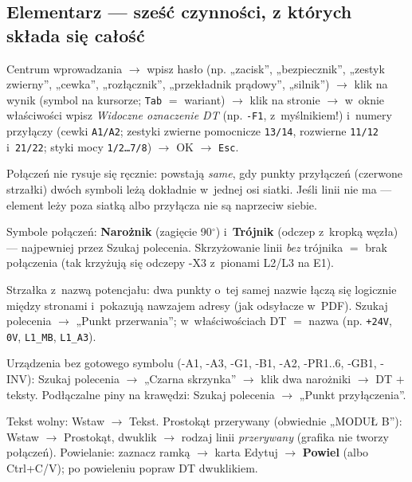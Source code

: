 \documentclass[11pt,a4paper]{article}
\begin{document}
\subsection{Elementarz --- sześć czynności, z których składa się całość}
\begin{description}[style=nextline]
\item[E.1 Wstawienie symbolu.] Centrum wprowadzania $\to$ wpisz hasło (np. „zacisk'', „bezpiecznik'',
„zestyk zwierny'', „cewka'', „rozłącznik'', „przekładnik prądowy'', „silnik'') $\to$ klik na wynik
(symbol na kursorze; \texttt{Tab} $=$ wariant) $\to$ klik na stronie $\to$ w~oknie właściwości wpisz
\emph{Widoczne oznaczenie DT} (np. \texttt{-F1}, z~myślnikiem!) i~numery przyłączy (cewki
\texttt{A1/A2}; zestyki zwierne pomocnicze \texttt{13/14}, rozwierne \texttt{11/12} i~\texttt{21/22};
styki mocy \texttt{1/2\ldots7/8}) $\to$ OK $\to$ \texttt{Esc}.
\item[E.2 Połączenia (autoconnecting).] Połączeń nie rysuje się ręcznie: powstają \emph{same}, gdy
punkty przyłączeń (czerwone strzałki) dwóch symboli leżą dokładnie w~jednej osi siatki. Jeśli linii
nie ma --- element leży poza siatką albo przyłącza nie są naprzeciw siebie.
\item[E.3 Zagięcia i rozgałęzienia.] Symbole połączeń: \textbf{Narożnik} (zagięcie 90$^{\circ}$)
i~\textbf{Trójnik} (odczep z~kropką węzła) --- najpewniej przez Szukaj polecenia. Skrzyżowanie linii
\emph{bez} trójnika $=$ brak połączenia (tak krzyżują się odczepy -X3 z~pionami L2/L3 na E1).
\item[E.4 Punkt przerwania.] Strzałka z~nazwą potencjału: dwa punkty o~tej samej nazwie łączą się
logicznie między stronami i~pokazują nawzajem adresy (jak odsyłacze w~PDF). Szukaj polecenia $\to$
„Punkt przerwania''; w~właściwościach DT $=$ nazwa (np. \texttt{+24V}, \texttt{0V}, \texttt{L1\_MB},
\texttt{L1\_A3}).
\item[E.5 Czarna skrzynka.] Urządzenia bez gotowego symbolu (-A1, -A3, -G1, -B1, -A2, -PR1..6, -GB1,
-INV): Szukaj polecenia $\to$ „Czarna skrzynka'' $\to$ klik dwa narożniki $\to$ DT $+$ teksty.
Podłączalne piny na krawędzi: Szukaj polecenia $\to$ „Punkt przyłączenia''.
\item[E.6 Teksty, grafika, powielanie.] Tekst wolny: Wstaw $\to$ Tekst. Prostokąt przerywany
(obwiednie „MODUŁ B''): Wstaw $\to$ Prostokąt, dwuklik $\to$ rodzaj linii \emph{przerywany} (grafika
nie tworzy połączeń). Powielanie: zaznacz ramką $\to$ karta Edytuj $\to$ \textbf{Powiel} (albo
Ctrl+C/V); po powieleniu popraw DT dwuklikiem.
\end{description}
\end{document}
